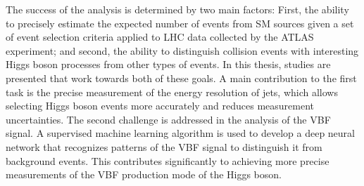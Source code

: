 The success of the \HWW analysis is determined by two main factors: 
First, the ability to precisely estimate the expected number of events from SM sources given a set of event selection criteria applied to LHC data collected by the ATLAS experiment; and second, the ability to distinguish collision events with interesting Higgs boson processes from other types of events.
In this thesis, studies are presented that work towards both of these goals.
A main contribution to the first task is the precise measurement of the energy resolution of jets, which allows selecting Higgs boson events more accurately and reduces measurement uncertainties.
The second challenge is addressed in the analysis of the VBF signal.
A supervised machine learning algorithm is used to develop a deep neural network that recognizes patterns of the VBF signal to distinguish it from background events.
This contributes significantly to achieving more precise measurements of the VBF production mode of the Higgs boson.




